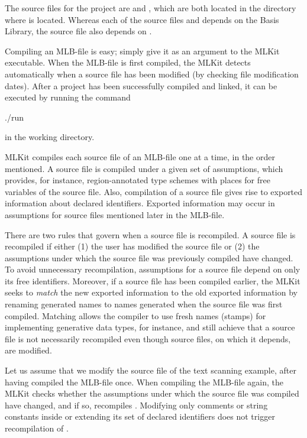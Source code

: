 \documentclass[12pt]{book}
\begin{document}
\noindent
The source files for the project are  and ,
which are both located in the directory where  is located. Whereas
each of the source files  and  depends on the Basis
Library, the source file  also depends on .

Compiling an MLB-file is easy; simply give it as an argument to the MLKit
executable. When the MLB-file is first compiled, the MLKit detects automatically
when a source file has been modified (by checking file modification
dates). After a project has been successfully compiled and linked, it can be
executed by running the command
%
%
%
\begin{scriptcode}
  ./run
\end{scriptcode}
in the working directory.

MLKit compiles each source file of an MLB-file one at a time, in the order
mentioned. A source file is compiled under a given set of assumptions, which
provides, for instance, region-annotated type schemes with places for free
variables of the source file. Also, compilation of a source file gives rise to
exported information about declared identifiers. Exported information may occur
in assumptions for source files mentioned later in the MLB-file.

There are two rules that govern when a source file is recompiled.  A source file
is recompiled if either (1) the user has modified the source file or (2) the
assumptions under which the source file was previously compiled have changed. To
avoid unnecessary recompilation, assumptions for a source file depend on only
its free identifiers.  Moreover, if a source file has been compiled earlier, the
MLKit seeks to
%
%
%
{\em match\/} the new exported information to the old exported information by
renaming generated names to names generated when the source file was first
compiled. Matching allows the compiler to use fresh names (stamps) for
implementing generative data types, for instance, and still achieve that a
source file is not necessarily
%
%
%
recompiled even though source files, on which it depends, are modified.

Let us assume that we modify the source file  of the text scanning
example, after having compiled the MLB-file  once. When
compiling the MLB-file again, the MLKit checks whether the assumptions under
which the source file  was compiled have changed, and if so,
recompiles .  Modifying only comments or string constants inside
 or extending its set of declared identifiers does not trigger
recompilation of .
\end{document}
